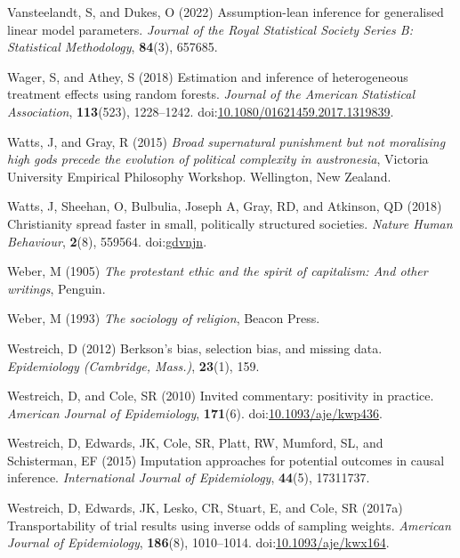 \documentclass[
  singlecolumn]{article}
\newlength{\cslhangindent}
\newenvironment{CSLReferences}[2] %
 {\begin{list}{}{%
  \setlength{\itemindent}{0pt}
  \setlength{\leftmargin}{0pt}
  \setlength{\parsep}{0pt}
  \ifodd #1
   \setlength{\leftmargin}{\cslhangindent}
   \setlength{\itemindent}{-1\cslhangindent}
  \fi
  \setlength{\itemsep}{#2\baselineskip}}}
 {\end{list}}
\begin{document}
\begin{CSLReferences}{1}{0}
Vansteelandt, S, and Dukes, O (2022) Assumption-lean inference for
generalised linear model parameters. \emph{Journal of the Royal
Statistical Society Series B: Statistical Methodology}, \textbf{84}(3),
657685.

Wager, S, and Athey, S (2018) Estimation and inference of heterogeneous
treatment effects using random forests. \emph{Journal of the American
Statistical Association}, \textbf{113}(523), 1228--1242.
doi:\href{https://doi.org/10.1080/01621459.2017.1319839}{10.1080/01621459.2017.1319839}.

Watts, J, and Gray, R (2015) \emph{Broad supernatural punishment but not
moralising high gods precede the evolution of political complexity in
austronesia}, Victoria University Empirical Philosophy Workshop.
Wellington, New Zealand.

Watts, J, Sheehan, O, Bulbulia, Joseph A, Gray, RD, and Atkinson, QD
(2018) Christianity spread faster in small, politically structured
societies. \emph{Nature Human Behaviour}, \textbf{2}(8), 559564.
doi:\href{https://doi.org/gdvnjn}{gdvnjn}.

Weber, M (1905) \emph{The protestant ethic and the spirit of capitalism:
And other writings}, Penguin.

Weber, M (1993) \emph{The sociology of religion}, Beacon Press.

Westreich, D (2012) Berkson's bias, selection bias, and missing data.
\emph{Epidemiology (Cambridge, Mass.)}, \textbf{23}(1), 159.

Westreich, D, and Cole, SR (2010) Invited commentary: positivity in
practice. \emph{American Journal of Epidemiology}, \textbf{171}(6).
doi:\href{https://doi.org/10.1093/aje/kwp436}{10.1093/aje/kwp436}.

Westreich, D, Edwards, JK, Cole, SR, Platt, RW, Mumford, SL, and
Schisterman, EF (2015) Imputation approaches for potential outcomes in
causal inference. \emph{International Journal of Epidemiology},
\textbf{44}(5), 17311737.

Westreich, D, Edwards, JK, Lesko, CR, Stuart, E, and Cole, SR (2017a)
Transportability of trial results using inverse odds of sampling
weights. \emph{American Journal of Epidemiology}, \textbf{186}(8),
1010--1014.
doi:\href{https://doi.org/10.1093/aje/kwx164}{10.1093/aje/kwx164}.


\end{CSLReferences}
\end{document}
